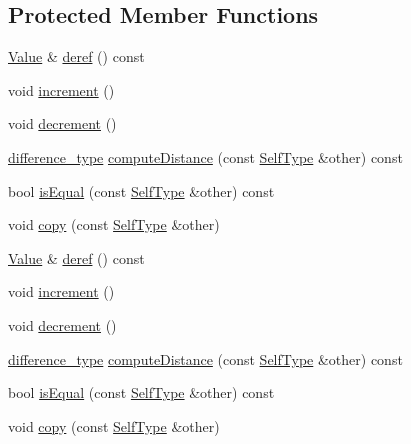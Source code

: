 \subsection*{Protected Member Functions}
\begin{DoxyCompactItemize}
\item 
\hyperlink{class_json_1_1_value}{Value} \& \hyperlink{class_json_1_1_value_iterator_base_aa5b75c9514a30ba2ea3c9a35c165c18e}{deref} () const
\item 
void \hyperlink{class_json_1_1_value_iterator_base_afe58f9534e1fd2033419fd9fe244551e}{increment} ()
\item 
void \hyperlink{class_json_1_1_value_iterator_base_affc8cf5ff54a9f432cc693362c153fa6}{decrement} ()
\item 
\hyperlink{class_json_1_1_value_iterator_base_a4e44bf8cbd17ec8d6e2c185904a15ebd}{difference\+\_\+type} \hyperlink{class_json_1_1_value_iterator_base_af11473c9e20d07782e42b52a2f9e4540}{compute\+Distance} (const \hyperlink{class_json_1_1_value_iterator_base_a9d2a940d03ea06d20d972f41a89149ee}{Self\+Type} \&other) const
\item 
bool \hyperlink{class_json_1_1_value_iterator_base_a010b5ad3f3337ae3732e5d7e16ca5e25}{is\+Equal} (const \hyperlink{class_json_1_1_value_iterator_base_a9d2a940d03ea06d20d972f41a89149ee}{Self\+Type} \&other) const
\item 
void \hyperlink{class_json_1_1_value_iterator_base_a496e6aba44808433ec5858c178be5719}{copy} (const \hyperlink{class_json_1_1_value_iterator_base_a9d2a940d03ea06d20d972f41a89149ee}{Self\+Type} \&other)
\item 
\hyperlink{class_json_1_1_value}{Value} \& \hyperlink{class_json_1_1_value_iterator_base_a4521c4a1e7cba96a4964f3a540c68676}{deref} () const
\item 
void \hyperlink{class_json_1_1_value_iterator_base_afe58f9534e1fd2033419fd9fe244551e}{increment} ()
\item 
void \hyperlink{class_json_1_1_value_iterator_base_affc8cf5ff54a9f432cc693362c153fa6}{decrement} ()
\item 
\hyperlink{class_json_1_1_value_iterator_base_a4e44bf8cbd17ec8d6e2c185904a15ebd}{difference\+\_\+type} \hyperlink{class_json_1_1_value_iterator_base_a259064742a8ebd70107f1901bd9bb14b}{compute\+Distance} (const \hyperlink{class_json_1_1_value_iterator_base_a9d2a940d03ea06d20d972f41a89149ee}{Self\+Type} \&other) const
\item 
bool \hyperlink{class_json_1_1_value_iterator_base_a010b5ad3f3337ae3732e5d7e16ca5e25}{is\+Equal} (const \hyperlink{class_json_1_1_value_iterator_base_a9d2a940d03ea06d20d972f41a89149ee}{Self\+Type} \&other) const
\item 
void \hyperlink{class_json_1_1_value_iterator_base_a496e6aba44808433ec5858c178be5719}{copy} (const \hyperlink{class_json_1_1_value_iterator_base_a9d2a940d03ea06d20d972f41a89149ee}{Self\+Type} \&other)
\end{DoxyCompactItemize}
